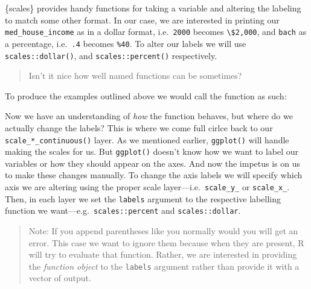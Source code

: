 \documentclass[
]{book}
\newenvironment{Shaded}{\begin{snugshade}}{\end{snugshade}}
\newcommand{\CommentTok}[1]{\textcolor[rgb]{0.56,0.35,0.01}{\textit{#1}}}
\newcommand{\DecValTok}[1]{\textcolor[rgb]{0.00,0.00,0.81}{#1}}
\newcommand{\KeywordTok}[1]{\textcolor[rgb]{0.13,0.29,0.53}{\textbf{#1}}}
\newcommand{\NormalTok}[1]{#1}
\newcommand{\OperatorTok}[1]{\textcolor[rgb]{0.81,0.36,0.00}{\textbf{#1}}}
\begin{document}
\{scales\} provides handy functions for taking a variable and altering the labeling to match some other format. In our case, we are interested in printing our \texttt{med\_house\_income} as in a dollar format, i.e.~\texttt{2000} becomes \texttt{\textbackslash{}\$2,000}, and \texttt{bach} as a percentage, i.e.~\texttt{.4} becomes \texttt{\%40}. To alter our labels we will use \texttt{scales::dollar()}, and \texttt{scales::percent()} respectively.

\begin{quote}
Isn't it nice how well named functions can be sometimes?
\end{quote}

To produce the examples outlined above we would call the function as such:

\begin{Shaded}
\end{Shaded}

Now we have an understanding of \emph{how} the function behaves, but where do we actually change the labels? This is where we come full cirlce back to our \texttt{scale\_*\_continuous()} layer. As we mentioned earlier, \texttt{ggplot()} will handle making the scales for us. But \texttt{ggplot()} doesn't know how we want to label our variables or how they should appear on the axes. And now the impetus is on us to make these changes manually. To change the axis labels we will specify which axis we are altering using the proper scale layer---i.e.~\texttt{scale\_y\_} or \texttt{scale\_x\_}. Then, in each layer we set the \texttt{labels} argument to the respective labelling function we want---e.g.~\texttt{scales::percent} and \texttt{scales::dollar}.

\begin{quote}
Note: If you append parentheses like you normally would you will get an error. This case we want to ignore them because when they are present, R will try to evaluate that function. Rather, we are interested in providing the \emph{function object} to the \texttt{labels} argument rather than provide it with a vector of output.
\end{quote}
\end{document}
